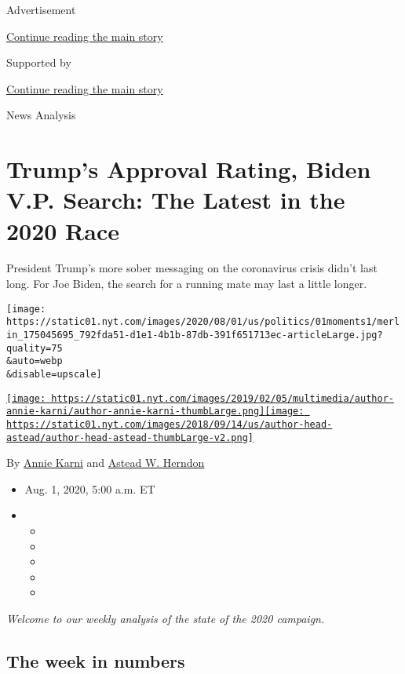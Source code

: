 Advertisement

\protect\hyperlink{after-top}{Continue reading the main story}

Supported by

\protect\hyperlink{after-sponsor}{Continue reading the main story}

News Analysis

\hypertarget{trumps-approval-rating-biden-vp-search-the-latest-in-the-2020-race}{%
\section{Trump's Approval Rating, Biden V.P. Search: The Latest in the
2020
Race}\label{trumps-approval-rating-biden-vp-search-the-latest-in-the-2020-race}}

President Trump's more sober messaging on the coronavirus crisis didn't
last long. For Joe Biden, the search for a running mate may last a
little longer.

\texttt{[image: https://static01.nyt.com/images/2020/08/01/us/politics/01moments1/merlin\_175045695\_792fda51-d1e1-4b1b-87db-391f651713ec-articleLarge.jpg?quality=75\\\&auto=webp\\\&disable=upscale]}

\href{https://www.nytimes.com/by/annie-karni}{\texttt{[image: https://static01.nyt.com/images/2019/02/05/multimedia/author-annie-karni/author-annie-karni-thumbLarge.png]}}\href{https://www.nytimes.com/by/astead-w-herndon}{\texttt{[image: https://static01.nyt.com/images/2018/09/14/us/author-head-astead/author-head-astead-thumbLarge-v2.png]}}

By \href{https://www.nytimes.com/by/annie-karni}{Annie Karni} and
\href{https://www.nytimes.com/by/astead-w-herndon}{Astead W. Herndon}

\begin{itemize}
\item
  Aug. 1, 2020, 5:00 a.m. ET
\item
  \begin{itemize}
  \item
  \item
  \item
  \item
  \item
  \end{itemize}
\end{itemize}

\emph{Welcome to our weekly analysis of the state of the 2020 campaign.}

\hypertarget{the-week-in-numbers}{%
\subsection{The week in numbers}\label{the-week-in-numbers}}

